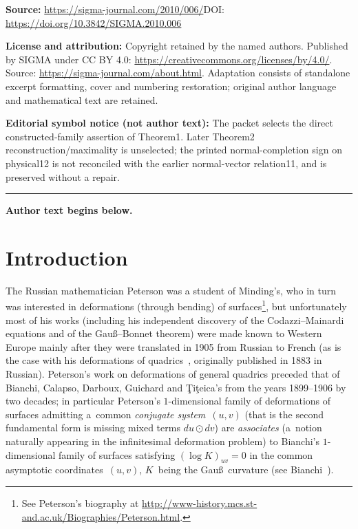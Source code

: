 \documentclass[11pt]{article}
\begin{document}
\noindent\textbf{Source:} \url{https://sigma-journal.com/2010/006/}\quad DOI: \url{https://doi.org/10.3842/SIGMA.2010.006}\par
\noindent\textbf{License and attribution:} Copyright retained by the named authors. Published by SIGMA under CC BY 4.0: \url{https://creativecommons.org/licenses/by/4.0/}. Source: \url{https://sigma-journal.com/about.html}. Adaptation consists of standalone excerpt formatting, cover and numbering restoration; original author language and mathematical text are retained.\par
\noindent\textbf{Editorial symbol notice (not author text):} The packet selects the direct constructed-family assertion of Theorem1. Later Theorem2 reconstruction/maximality is unselected; the printed normal-completion sign on physical12 is not reconciled with the earlier normal-vector relation11, and is preserved without a repair.\par
\medskip\hrule\medskip\noindent\textbf{Author text begins below.}\par
\setcounter{section}{0}
\setcounter{subsection}{0}
\setcounter{subsubsection}{0}
\setcounter{equation}{0}
\section{Introduction}

The Russian mathematician Peterson was a student of Minding's, who
in turn was interested in deformations (through bending) of
surfaces\footnote{See Peterson's biography at \url{http://www-history.mcs.st-and.ac.uk/Biographies/Peterson.html}.}, but unfortunately most of his works
(including his independent discovery of the Codazzi--Mainardi
equations and of the Gau\ss--Bonnet theorem) were made known to
Western Europe mainly after they were translated in 1905 from
Russian to French (as is the case with his deformations of
quadrics~\cite{P}, originally published in 1883 in Russian).
Peterson's work on deformations of general quadrics preceded that
of Bianchi, Calapso, Darboux, Guichard and \c{T}i\c{t}eica's from
the years 1899--1906 by two decades; in particu\-lar Peterson's
$1$-dimensional family of deformations of surfaces admitting a~common {\it conjugate system}~$(u,v)$ (that is the second
fundamental form is missing mixed terms $du\odot dv$) are {\it
associates} (a~notion naturally appearing in the inf\/initesimal
deformation problem) to Bianchi's $1$-dimensional family of
surfaces satisfying $(\log K)_{uv}=0$ in the common asymptotic
coordinates~$(u,v)$, $K$~being the Gau\ss\ curvature (see Bianchi~\cite[Vol.~2, \S\S~294, 295]{B1}).
\end{document}
